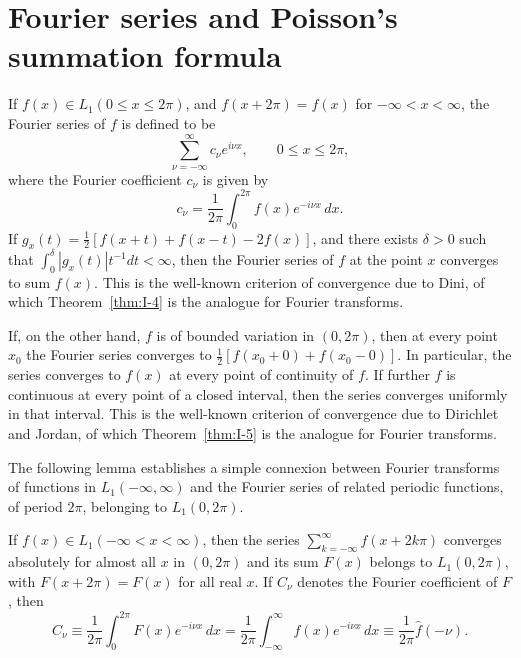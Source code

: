 \section{Fourier series and Poisson's summation formula}
\label{sec:I-5}

If $f(x)\in L_1(0\le x\le 2\pi)$, and $f(x+2\pi)=f(x)$ for $-\infty<x<\infty$, the Fourier series of $f$ is defined to be
\begin{equation}\label{eq:I-5.1}
\sum_{\nu=-\infty}^{\infty}c_\nu e^{i\nu x},\qquad 0\le x\le 2\pi,
\end{equation}
where the Fourier coefficient $c_\nu$ is given by
\begin{equation}\label{eq:I-5.2}
c_\nu=\frac{1}{2\pi}\int_0^{2\pi}f(x)e^{-i\nu x}\,dx.
\end{equation}
If $g_x(t)=\frac12[f(x+t)+f(x-t)-2f(x)]$, and there exists $\delta>0$ such that $\int_0^\delta|g_x(t)|t^{-1}dt<\infty$, then the Fourier series of $f$ at the point $x$ converges to sum $f(x)$. This is the well-known criterion of convergence due to Dini, of which Theorem~\ref{thm:I-4} is the analogue for Fourier transforms.

If, on the other hand, $f$ is of bounded variation in $(0,2\pi)$, then at every point $x_0$ the Fourier series converges to $\frac12[f(x_0+0)+f(x_0-0)]$. In particular, the series converges to $f(x)$ at every point of continuity of $f$. If further $f$ is continuous at every point of a closed interval, then the series converges uniformly in that interval. This is the well-known criterion of convergence due to Dirichlet and Jordan, of which Theorem~\ref{thm:I-5} is the analogue for Fourier transforms.

The following lemma establishes a simple connexion between Fourier transforms of functions in $L_1(-\infty,\infty)$ and the Fourier series of related periodic functions, of period $2\pi$, belonging to $L_1(0,2\pi)$.

\begin{lemma}\label{lem:I-5.3}
If $f(x)\in L_1(-\infty<x<\infty)$, then the series $\sum_{k=-\infty}^\infty f(x+2k\pi)$ converges absolutely for almost all $x$ in $(0,2\pi)$ and its sum $F(x)$ belongs to $L_1(0,2\pi)$, with $F(x+2\pi)=F(x)$ for all real $x$. If $C_\nu$ denotes the Fourier coefficient of $F$, then
\begin{equation}\label{eq:I-5.4}
C_\nu\equiv\frac{1}{2\pi}\int_0^{2\pi}F(x)e^{-i\nu x}\,dx
=\frac{1}{2\pi}\int_{-\infty}^{\infty}f(x)e^{-i\nu x}\,dx
\equiv\frac{1}{2\pi}\hat f(-\nu).
\end{equation}
\end{lemma}

